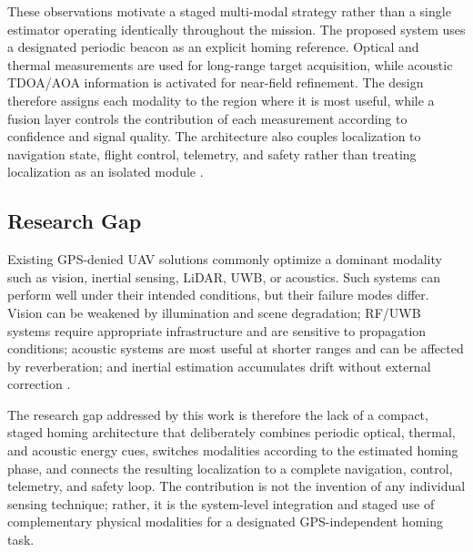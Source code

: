 \documentclass[conference]{IEEEtran}
\begin{document}
These observations motivate a staged multi-modal strategy rather than a single
estimator operating identically throughout the mission. The proposed system
uses a designated periodic beacon as an explicit homing reference. Optical and
thermal measurements are used for long-range target acquisition, while acoustic
TDOA/AOA information is activated for near-field refinement. The design
therefore assigns each modality to the region where it is most useful, while a
fusion layer controls the contribution of each measurement according to
confidence and signal quality. The architecture also couples localization to
navigation state, flight control, telemetry, and safety rather than treating
localization as an isolated module
\cite{gustafsson2012,mahony2012,lee2010}.


\subsection{Research Gap}

Existing GPS-denied UAV solutions commonly optimize a dominant modality such as
vision, inertial sensing, LiDAR, UWB, or acoustics. Such systems can perform
well under their intended conditions, but their failure modes differ. Vision
can be weakened by illumination and scene degradation; RF/UWB systems require
appropriate infrastructure and are sensitive to propagation conditions;
acoustic systems are most useful at shorter ranges and can be affected by
reverberation; and inertial estimation accumulates drift without external
correction
\cite{vanegas2016,leutenegger2015,orbslam3,zafari2019,brandstein2001,faessler2018}.

The research gap addressed by this work is therefore the lack of a compact,
staged homing architecture that deliberately combines periodic optical,
thermal, and acoustic energy cues, switches modalities according to the
estimated homing phase, and connects the resulting localization to a complete
navigation, control, telemetry, and safety loop. The contribution is not the
invention of any individual sensing technique; rather, it is the system-level
integration and staged use of complementary physical modalities for a
designated GPS-independent homing task.

\end{document}
